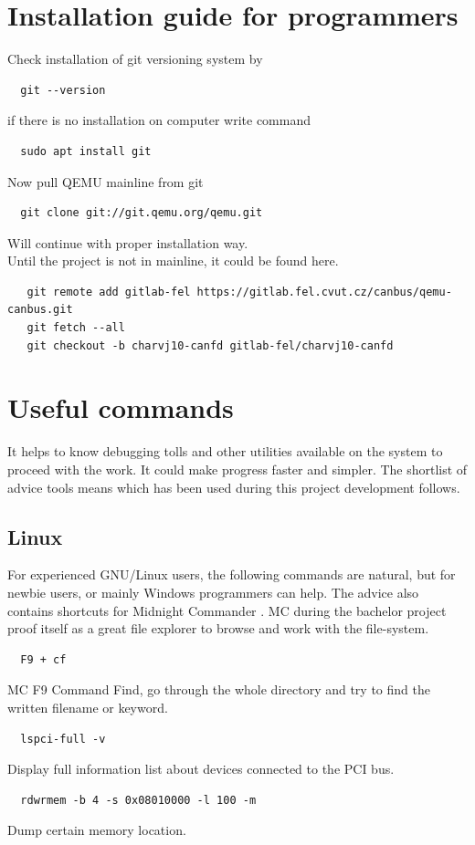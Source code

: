 \documentclass{ctuthesis}
\begin{document}
\appendix
\chapter{Installation guide for programmers}
  Check installation of git versioning system by
  \begin{verbatim}  git --version\end{verbatim}
  if there is no installation on computer write command
  \begin{verbatim}  sudo apt install git\end{verbatim}
  Now pull QEMU mainline from git
 \begin{verbatim}  git clone git://git.qemu.org/qemu.git\end{verbatim}
  Will continue with proper installation way. \\
  Until the project is not in mainline, it could be found here.
  \begin{verbatim}   git remote add gitlab-fel https://gitlab.fel.cvut.cz/canbus/qemu-canbus.git
   git fetch --all
   git checkout -b charvj10-canfd gitlab-fel/charvj10-canfd\end{verbatim}

\chapter{Useful commands}
  It helps to know debugging tolls and other utilities available on the system to proceed with the work. It could make progress faster and simpler. The shortlist of advice tools means which has been used during this project development follows.
 \section{Linux}
  For experienced GNU/Linux users, the following commands are natural, but for newbie users, or mainly Windows programmers can help. The advice also contains shortcuts for Midnight Commander \cite{mc}. MC during the bachelor project proof itself as a great file explorer to browse and work with the file-system.
  \begin{verbatim}  F9 + cf\end{verbatim}
  MC F9 Command Find, go through the whole directory and try to find the written filename or keyword.
  \begin{verbatim}  lspci-full -v\end{verbatim}
  Display full information list about devices connected to the PCI bus.
  \begin{verbatim}  rdwrmem -b 4 -s 0x08010000 -l 100 -m\end{verbatim}
  Dump certain memory location. \cite{rdwrmem}
 
\end{document}
